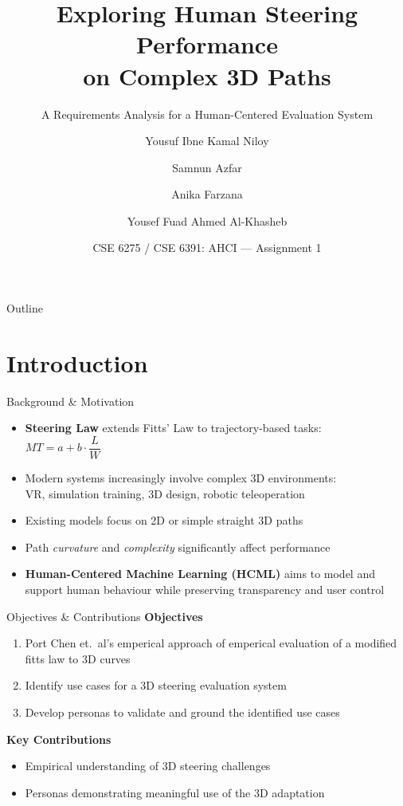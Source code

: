 \documentclass[aspectratio=169, 10pt]{beamer}
\title{Exploring Human Steering Performance\\on Complex 3D Paths}
\subtitle{A Requirements Analysis for a Human-Centered Evaluation System}
\author{
  Yousuf Ibne Kamal Niloy \and
  Samnun Azfar \and
  Anika Farzana \and
  Yousef Fuad Ahmed Al-Khasheb
}
\institute{
  Department of Computer Science and Engineering\\
  Islamic University of Technology (IUT), OIC
}
\date{CSE 6275 / CSE 6391: AHCI --- Assignment 1}
\begin{document}
\begin{frame}[plain]
  \titlepage
\end{frame}

\begin{frame}{Outline}
  \tableofcontents
\end{frame}

\section{Introduction}

\begin{frame}{Background \& Motivation}
  \begin{itemize}
    \item \textbf{Steering Law} extends Fitts' Law to trajectory-based tasks:\\
          $MT = a + b \cdot \dfrac{L}{W}$
    \item Modern systems increasingly involve \alert{complex 3D environments}:\\
          VR, simulation training, 3D design, robotic teleoperation
    \item Existing models focus on 2D or simple straight 3D paths
    \item Path \emph{curvature} and \emph{complexity} significantly affect performance
    \item \textbf{Human-Centered Machine Learning (HCML)} aims to model and support
          human behaviour while preserving transparency and user control
  \end{itemize}
\end{frame}

\begin{frame}{Objectives \& Contributions}
  \textbf{Objectives}
  \begin{enumerate}
    \item Port Chen et.\ al's emperical approach of emperical evaluation of a modified fitts law to 3D curves \cite{chen2025curves}
    \item Identify use cases for a 3D steering evaluation system
    \item Develop personas to validate and ground the identified use cases
  \end{enumerate}

  \vspace{0.5em}
  \textbf{Key Contributions}
  \begin{itemize}
    \item Empirical understanding of 3D steering challenges
    \item Personas demonstrating meaningful use of the 3D adaptation
  \end{itemize}
\end{frame}
\end{document}
